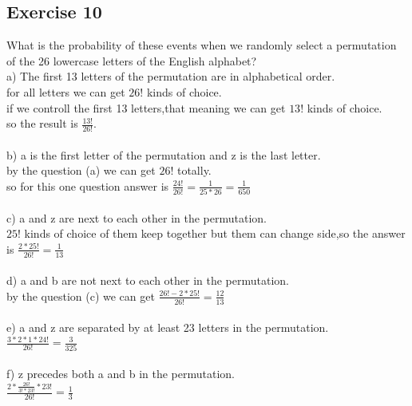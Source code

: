\documentclass[12pt]{article}
\begin{document}
\subsection*{Exercise 10}
What is the probability of these events when we randomly select a permutation of the 26 lowercase letters of the English alphabet?\\
a) The first 13 letters of the permutation are in alphabetical order. \\
for all letters we can get $26!$ kinds of choice.\\
if we controll the first 13 letters,that meaning we can get $13!$ kinds of choice.\\
so the result is $\frac{13!}{26!}$.\\
\\
b) a is the first letter of the permutation and z is the last letter. \\
by the question (a) we can get $26!$ totally.\\
so for this one question answer is $\frac{24!}{26!}=\frac{1}{25*26}=\frac{1}{650}$\\
\\
c) a and z are next to each other in the permutation.\\
$25!$ kinds of choice of them keep together but them can change side,so the answer is $\frac{2*25!}{26!}=\frac{1}{13}$\\
\\
d) a and b are not next to each other in the permutation. \\
by the question (c) we can get $\frac{26!-2*25!}{26!}=\frac{12}{13}$\\
\\
e) a and z are separated by at least 23 letters in the permutation. \\
$\frac{3*2*1*24!}{26!}=\frac{3}{325}$\\
\\
f) z precedes both a and b in the permutation.\\
$\frac{2*\frac{26!}{3!*23!}*23!}{26!}=\frac{1}{3}$\\
\\
\end{document}
